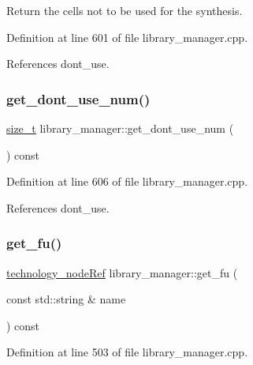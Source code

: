 Return the cells not to be used for the synthesis. 



Definition at line 601 of file library\+\_\+manager.\+cpp.



References dont\+\_\+use.

\mbox{\label{classlibrary__manager_aa04c3b1e52eadbd800212b36b8770b2a}} 
\subsubsection{\texorpdfstring{get\+\_\+dont\+\_\+use\+\_\+num()}{get\_dont\_use\_num()}}
{\footnotesize\ttfamily \hyperlink{tutorial__fpt__2017_2intro_2sixth_2test_8c_a7c94ea6f8948649f8d181ae55911eeaf}{size\+\_\+t} library\+\_\+manager\+::get\+\_\+dont\+\_\+use\+\_\+num (\begin{DoxyParamCaption}{ }\end{DoxyParamCaption}) const}



Definition at line 606 of file library\+\_\+manager.\+cpp.



References dont\+\_\+use.

\mbox{\label{classlibrary__manager_a70a66a780470a75540aee74e21a5c3bf}} 
\subsubsection{\texorpdfstring{get\+\_\+fu()}{get\_fu()}}
{\footnotesize\ttfamily \hyperlink{technology__node_8hpp_a33dd193b7bd6b987bf0d8a770a819fa7}{technology\+\_\+node\+Ref} library\+\_\+manager\+::get\+\_\+fu (\begin{DoxyParamCaption}\item[{const std\+::string \&}]{name }\end{DoxyParamCaption}) const}



Definition at line 503 of file library\+\_\+manager.\+cpp.



